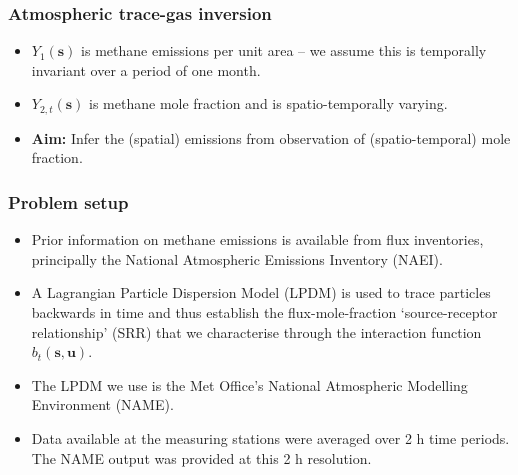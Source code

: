 \documentclass{beamer}
\newcommand{\svec} {\textbf{s}}
\newcommand{\uvec} {\textbf{u}}
\begin{document}
\begin{frame}
\frametitle{Atmospheric trace-gas inversion}

\begin{itemize}
\item $Y_1(\svec)$ is methane emissions per unit area -- we assume this is temporally invariant over a period of one month. \vfill
\item $Y_{2,t}(\svec)$ is methane mole fraction and is spatio-temporally varying. \vfill
\item {\bf Aim:} Infer the (spatial) emissions from observation of (spatio-temporal) mole fraction.\vfill
\end{itemize}
\end{frame}

\begin{frame}
\frametitle{Problem setup}

\begin{itemize}
\item Prior information on methane emissions is available from flux inventories, principally the National Atmospheric Emissions Inventory (NAEI).\vfill
\item A Lagrangian Particle Dispersion Model (LPDM) is used to trace particles backwards in time and thus establish the flux-mole-fraction `source-receptor relationship' (SRR) that we characterise through the interaction function $b_t(\svec,\uvec)$.\vfill
\item The LPDM we use is the Met Office's National Atmospheric Modelling Environment (NAME).\vfill
\item Data available at the measuring stations were averaged over 2 h time periods. The NAME output was provided at this 2 h resolution.\vfill
\end{itemize}
\end{frame}
\end{document}
